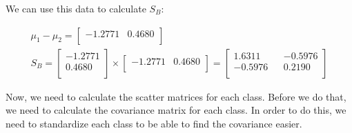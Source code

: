 \documentclass[12pt]{article}
\begin{document}
We can use this data to calculate $S_{B}$:
\begin{center}
\begin{gather}
\mu_{1} - \mu_2 =
\begin{bmatrix}
-1.2771 & 0.4680\\
\end{bmatrix} \nonumber \\
S_{B} = \begin{bmatrix}
-1.2771\\
0.4680\\
\end{bmatrix}
\times
\begin{bmatrix}
-1.2771 & 0.4680\\
\end{bmatrix}
=
\begin{bmatrix}
1.6311 && -0.5976\\
-0.5976 && 0.2190\\
\end{bmatrix}
\end{gather}
\end{center}
Now, we need to calculate the scatter matrices for each class. Before we do that, we need to calculate the covariance matrix for each class. In order to do this, we need to standardize each class to be able to find the covariance easier.
\end{document}
